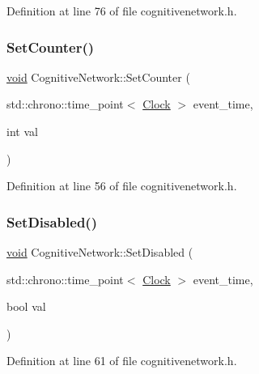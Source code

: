 Definition at line 76 of file cognitivenetwork.\+h.

\mbox{\label{class_cognitive_network_a23c6a11d9f15a141f69a9779f174bfb3}} 
\subsubsection{\texorpdfstring{Set\+Counter()}{SetCounter()}}
{\footnotesize\ttfamily \mbox{\hyperlink{glad_8h_a950fc91edb4504f62f1c577bf4727c29}{void}} Cognitive\+Network\+::\+Set\+Counter (\begin{DoxyParamCaption}\item[{std\+::chrono\+::time\+\_\+point$<$ \mbox{\hyperlink{universe_8h_a0ef8d951d1ca5ab3cfaf7ab4c7a6fd80}{Clock}} $>$}]{event\+\_\+time,  }\item[{int}]{val }\end{DoxyParamCaption})\hspace{0.3cm}{\ttfamily [inline]}}



Definition at line 56 of file cognitivenetwork.\+h.

\mbox{\label{class_cognitive_network_ac29e676c84244f5b64c0083a0efead28}} 
\subsubsection{\texorpdfstring{Set\+Disabled()}{SetDisabled()}}
{\footnotesize\ttfamily \mbox{\hyperlink{glad_8h_a950fc91edb4504f62f1c577bf4727c29}{void}} Cognitive\+Network\+::\+Set\+Disabled (\begin{DoxyParamCaption}\item[{std\+::chrono\+::time\+\_\+point$<$ \mbox{\hyperlink{universe_8h_a0ef8d951d1ca5ab3cfaf7ab4c7a6fd80}{Clock}} $>$}]{event\+\_\+time,  }\item[{bool}]{val }\end{DoxyParamCaption})\hspace{0.3cm}{\ttfamily [inline]}}



Definition at line 61 of file cognitivenetwork.\+h.

